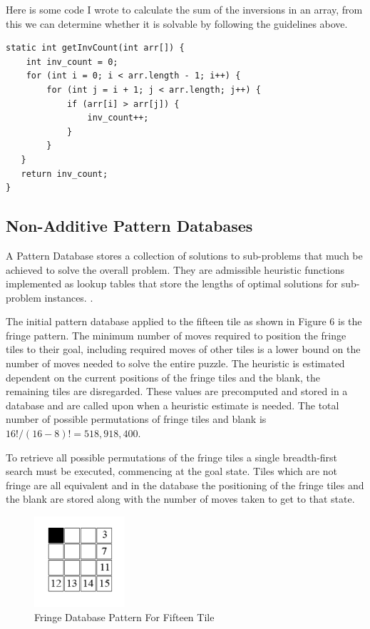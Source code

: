 \documentclass[progress]{cmpreport}
\begin{document}
Here is some code I wrote to calculate the sum of the inversions in an array, from this we can determine whether it is solvable by following the guidelines above.
\begin{verbatim}
static int getInvCount(int arr[]) {
    int inv_count = 0;
    for (int i = 0; i < arr.length - 1; i++) {
        for (int j = i + 1; j < arr.length; j++) {
            if (arr[i] > arr[j]) {
                inv_count++;
            }
        }
   }
   return inv_count;
}
\end{verbatim}


\subsection{Non-Additive Pattern Databases}
A Pattern Database stores a collection of solutions to sub-problems that much be achieved to solve the overall problem. They are admissible heuristic functions implemented as lookup tables that store the lengths of optimal solutions for sub-problem instances. \citep{DBLP:journals/jair/FelnerKMH07}.

The initial pattern database applied to the fifteen tile as shown in Figure 6 is the fringe pattern. The minimum number of moves required to position the fringe tiles to their goal, including required moves of other tiles is a lower bound on the number of moves needed to solve the entire puzzle. The heuristic is estimated dependent on the current positions of the fringe tiles and the blank, the remaining tiles are disregarded. These values are precomputed and stored in a database and are called upon when a heuristic estimate is needed. The total number of possible permutations of fringe tiles and blank is $16!/(16-8)!=518,918,400$. 

To retrieve all possible permutations of the fringe tiles a single breadth-first search must be executed, commencing at the goal state. Tiles which are not fringe are all equivalent and in the database the positioning of the fringe tiles and the blank are stored along with the number of moves taken to get to that state.

\begin{figure}[ht]
	\centering
	\includegraphics[width=0.30\textwidth]{fringe}
	\captionsetup{justification=centering}
	\caption{Fringe Database Pattern For Fifteen Tile}
\end{figure}
\end{document}
